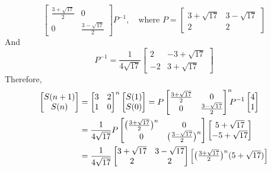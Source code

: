 \documentclass[12pt,a4paper]{report}
\theoremstyle{definition}
\begin{document}
\begin{enumerate}
\begin{enumerate}
\[\begin{bmatrix}
		\frac{3+\sqrt{17}}{2} & 0\\
		0 & \frac{3-\sqrt{17}}{2}
		\end{bmatrix}P^{-1},\quad\mbox{where }P=\begin{bmatrix}
		3+\sqrt{17} & 3-\sqrt{17}\\
		2 & 2
		\end{bmatrix}
		\]
		And
		\[
		P^{-1}=\frac{1}{4\sqrt{17}}\begin{bmatrix}
		2 & -3+\sqrt{17}\\
		-2 & 3+\sqrt{17}
		\end{bmatrix}
		\]
		Therefore,
		\begin{align*}
		    \begin{bmatrix}
		    S(n+1)\\
		    S(n)
		    \end{bmatrix}&=\begin{bmatrix}
		    3 & 2\\
		    1 & 0
		    \end{bmatrix}^n\begin{bmatrix}
		    S(1)\\
		    S(0)
		    \end{bmatrix}=P\begin{bmatrix}
    		\frac{3+\sqrt{17}}{2} & 0\\
    		0 & \frac{3-\sqrt{17}}{2}
    		\end{bmatrix}^n\hspace{-5pt} P^{-1}\begin{bmatrix}
    		4\\
    		1
    		\end{bmatrix}\\
    		&=\frac{1}{4\sqrt{17}}P\begin{bmatrix}
    		\big(\frac{3+\sqrt{17}}{2}\big)^n & 0\\
    		0 & \big(\frac{3-\sqrt{17}}{2}\big)^n
    		\end{bmatrix}\begin{bmatrix}
    		5+\sqrt{17}\\
    		-5+\sqrt{17}
    		\end{bmatrix}\\
    		&=\frac{1}{4\sqrt{17}}\begin{bmatrix}
    		3+\sqrt{17} & 3-\sqrt{17}\\
    		2 & 2
    		\end{bmatrix}\begin{bmatrix}
    		\big(\frac{3+\sqrt{17}}{2}\big)^n(5+\sqrt{17})\\[3pt]

\end{bmatrix}
\end{align*}
\end{enumerate}
\end{enumerate}
\end{document}
